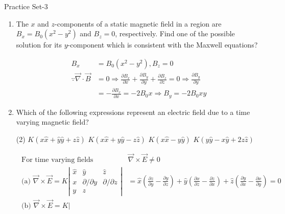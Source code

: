 






\newpage
\begin{abox}
	Practice Set-3
\end{abox}
\begin{enumerate}
	\item 	The $x$ and $z$-components of a static magnetic field in a region are $B_{x}=B_{0}\left(x^{2}-y^{2}\right)$ and $B_{z}=0$, respectively. Find one of the possible solution for its $y$-component which is consistent with the Maxwell equations?
	\begin{answer}
		\begin{align*}
		 B_{x}&=B_{0}\left(x^{2}-y^{2}\right), B_{z}=0\\
		\because \vec{\nabla} \cdot \vec{B}&=0 \Rightarrow \frac{\partial B_{x}}{\partial x}+\frac{\partial B_{y}}{\partial y}+\frac{\partial B_{z}}{\partial z}=0 \Rightarrow \frac{\partial B_{y}}{\partial y}\\&=-\frac{\partial B_{x}}{\partial x}=-2 B_{0} x \Rightarrow B_{y}=-2 B_{0} x y
		\end{align*}
	\end{answer}
	\item 	Which of the following expressions represent an electric field due to a time varying magnetic field?
	\begin{tasks}(2)
		\task[\textbf{a.}]$K(x \hat{x}+\hat{y} \hat{y}+z \hat{z})$
		\task[\textbf{b.}]$K(x \hat{x}+y \hat{y}-z \hat{z})$
		\task[\textbf{c.}] $K(x \hat{x}-y \hat{y})$
		\task[\textbf{d.}] $K(y \hat{y}-x \hat{y}+2 z \hat{z})$
	\end{tasks}
\begin{answer}
	\begin{align*}
	\text { For time varying fields } &\vec{\nabla} \times \vec{E} \neq 0\\
	\text { (a) } \vec{\nabla} \times \vec{E}=K\left|\begin{array}{ccc}
	\hat{x} & \hat{y} & \hat{z} \\
	x & \partial / \partial y & \partial / \partial z \\
	y & z
	\end{array}\right|&=\hat{x}\left(\frac{\partial z}{\partial y}-\frac{\partial y}{\partial z}\right)+\hat{y}\left(\frac{\partial x}{\partial z}-\frac{\partial z}{\partial x}\right)+\hat{z}\left(\frac{\partial y}{\partial x}-\frac{\partial x}{\partial y}\right)=0\\
	\text { (b) } \vec{\nabla} \times \vec{E}=K\left|\begin{array}{ccc}

\end{array}
\end{align*}
\end{answer}
\end{enumerate}
